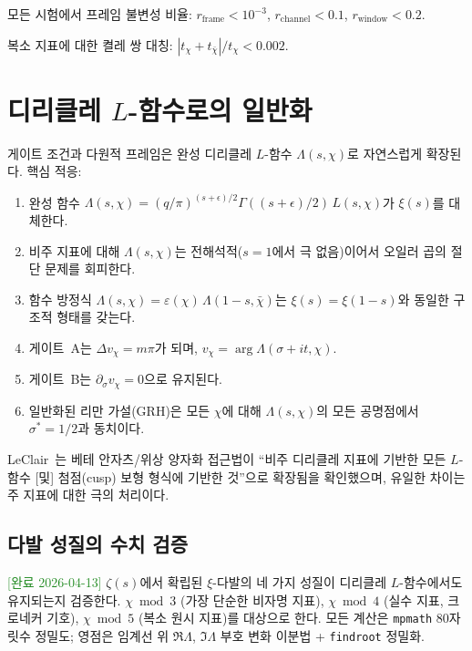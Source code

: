 \documentclass[11pt, a4paper]{article}
\theoremstyle{definition}
\theoremstyle{plain}
\newcommand{\xif}{\xi}
\begin{document}
모든 시험에서 프레임 불변성 비율:
$r_{\mathrm{frame}} < 10^{-3}$,
$r_{\mathrm{channel}} < 0.1$,
$r_{\mathrm{window}} < 0.2$.

복소 지표에 대한 켤레 쌍 대칭:
$|t_\chi + t_{\bar{\chi}}| / t_\chi < 0.002$.


\section{디리클레 $L$-함수로의 일반화}
\label{app:dirichlet}

게이트 조건과 다원적 프레임은 완성 디리클레 $L$-함수 $\Lambda(s,\chi)$로 자연스럽게 확장된다. 핵심 적응:

\begin{enumerate}
  \item 완성 함수 $\Lambda(s,\chi) = (q/\pi)^{(s+\epsilon)/2}
        \Gamma((s+\epsilon)/2)\,L(s,\chi)$가 $\xif(s)$를 대체한다.
  \item 비주 지표에 대해 $\Lambda(s,\chi)$는 전해석적($s=1$에서 극 없음)이어서 오일러 곱의 절단 문제를 회피한다.
  \item 함수 방정식 $\Lambda(s,\chi) = \varepsilon(\chi)\,
        \Lambda(1-s,\bar{\chi})$는 $\xif(s) = \xif(1-s)$와 동일한 구조적 형태를 갖는다.
  \item 게이트~A는 $\Delta v_\chi = m\pi$가 되며,
        $v_\chi = \arg\Lambda(\sigma+it,\chi)$.
  \item 게이트~B는 $\partial_\sigma v_\chi = 0$으로 유지된다.
  \item 일반화된 리만 가설(GRH)은 모든 $\chi$에 대해
        $\Lambda(s,\chi)$의 모든 공명점에서 $\sigma^* = 1/2$과 동치이다.
\end{enumerate}

LeClair~\cite{leclair2024}는 베테 안자츠/위상 양자화 접근법이 ``비주 디리클레 지표에 기반한 모든 $L$-함수 [및] 첨점(cusp) 보형 형식에 기반한 것''으로 확장됨을 확인했으며, 유일한 차이는 주 지표에 대한 극의 처리이다.

\subsection{다발 성질의 수치 검증}
\label{app:dirichlet:verify}

\textcolor{ForestGreen}{[완료 2026-04-13]}
$\zeta(s)$에서 확립된 $\xi$-다발의 네 가지 성질이 디리클레 $L$-함수에서도 유지되는지 검증한다. $\chi\bmod 3$ (가장 단순한 비자명 지표), $\chi\bmod 4$ (실수 지표, 크로네커 기호), $\chi\bmod 5$ (복소 원시 지표)를 대상으로 한다. 모든 계산은 \texttt{mpmath} 80자릿수 정밀도; 영점은 임계선 위 $\Re\Lambda$, $\Im\Lambda$ 부호 변화 이분법 + \texttt{findroot} 정밀화.
\end{document}
